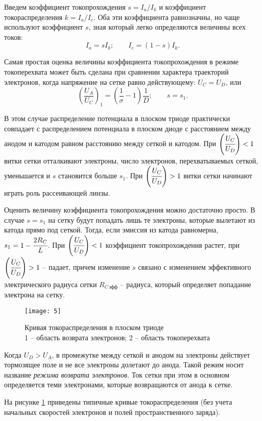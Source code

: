 Введем коэффициент токопрохождения \( s = I_a/I_k \) и коэффициент
токораспределения \( k = I_a/I_c \). Оба эти коэффициента равнозначны, но чаще
используют коэффициент \( s \), зная который легко определяются величины всех
токов:
\[
  I_a = s I_k; \qquad I_c = (1 - s) I_k.
\]

Самая простая оценка величины коэффициента токопрохождения в режиме
токоперехвата может быть сделана при сравнении характера траекторий электронов,
когда напряжение на сетке равно действующему: \( U_C = U_D \), или
\[
  \left( \frac{U_A}{U_C} \right)_1 = \left( \frac{1}{\sigma} - 1 \right)
  \frac{1}{D}; \qquad s = s_1.
\]

В этом случае распределение потенциала в плоском триоде практически совпадает
с распределением потенциала в плоском диоде с расстоянием между анодом и катодом
равном расстоянию между сеткой и катодом. При
\( \left( \cfrac{U_C}{U_D} \right) < 1 \) витки сетки отталкивают электроны,
число электронов, перехватываемых сеткой, уменьшается и \( s \) становится
больше \( s_1 \). При \( \left( \cfrac{U_C}{U_D} \right) > 1 \) витки сетки
начинают играть роль рассеивающей линзы.

Оценить величину коэффициента токопрохождения можно достаточно просто. В случае
\( s = s_1 \) на сетку будут попадать лишь те электроны, которые вылетают из
катода прямо под сеткой. Тогда, если эмиссия из катода равномерна,
\( s_1 = 1 - \cfrac{2R_C}{L} \). При \( \left( \cfrac{U_C}{U_D} \right) < 1 \)
коэффициент токопрохождения растет, при
\( \left( \cfrac{U_C}{U_D} \right) > 1 \) -- падает, причем изменение \( s \)
связано с изменением эффективного электрического радиуса сетки
\( R_{C\,\text{эфф}} \) -- радиуса, который определяет попадание электрона на
сетку.

\begin{figure}[b!]
  \center
  \texttt{[image: 5]}
  \caption{Кривая токораспределения в плоском триоде\\
  1 -- область возврата электронов; 2 -- область токоперехвата}
  \label{pic5}
\end{figure}

Когда \( U_D > U_A \), в промежутке между сеткой и анодом на электроны
действует тормозящее поле и не все электроны долетают до анода. Такой режим
носит название \emph{режима возврата электронов}. Ток сетки при этом в основном
определяется теми электронами, которые возвращаются от анода к сетке.

На рисунке \ref{pic5} приведены типичные кривые токораспределения (без учета
начальных скоростей электронов и полей пространственного заряда).

